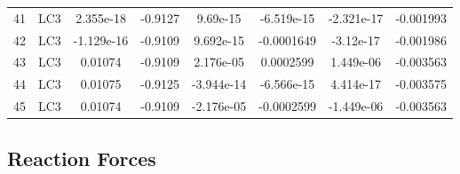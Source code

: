 \documentclass{article}%
\begin{document}
\begin{longtable}{| c c | c c c c c c |}
41&LC3&2.355e{-}18&{-}0.9127&9.69e{-}15&{-}6.519e{-}15&{-}2.321e{-}17&{-}0.001993\\%
42&LC3&{-}1.129e{-}16&{-}0.9109&9.692e{-}15&{-}0.0001649&{-}3.12e{-}17&{-}0.001986\\%
43&LC3&0.01074&{-}0.9109&2.176e{-}05&0.0002599&1.449e{-}06&{-}0.003563\\%
44&LC3&0.01075&{-}0.9125&{-}3.944e{-}14&{-}6.566e{-}15&4.414e{-}17&{-}0.003575\\%
45&LC3&0.01074&{-}0.9109&{-}2.176e{-}05&{-}0.0002599&{-}1.449e{-}06&{-}0.003563\\%
\end{longtable}

%
\subsection{Reaction Forces}%
\label{subsec:ReactionForces}%
\end{document}
